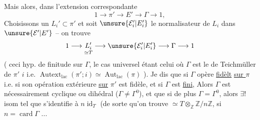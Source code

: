 Mais alors, dans l'extension correspondante
\[
1\longrightarrow\pi'\longrightarrow E'\longrightarrow\Gamma\longrightarrow1,
\]
Choisissons un \(L_i'\subset\pi'\) et soit \(\unsure{\mathcal E_i'|E_i'}\) le normalisateur de \(L_i\) dans \(\unsure{\mathcal E'|E'}\) -- on trouve
\[
1\longrightarrow
\underset{\simeq T}{L_i'}
\longrightarrow\unsure{\mathcal E_i'|E_i'}
\longrightarrow\Gamma\longrightarrow1
\]
( ceci   hyp. de finitude sur
$\Gamma$, le cas universel étant celui où $\Gamma$
est le  de Teichmüller de $\pi'$  $i$
i.e. $\operatorname{Autext}_{\mathrm{lac}}(\pi';i)\simeq\operatorname{Aut}_{\mathrm{lac}}(\pi)$ ). Je
dis que si $\Gamma$ opère \uline{fidèlt} \uline{sur $\pi$}
i.e. si son opération extérieure \uline{sur}
\uline{$\pi'$} est fidèle, et si $\Gamma$ est \uline{fini},
Alors $\Gamma$ est nécessairement cyclique 
ou dihédral ($\Gamma\ne\Gamma^0$), et que si de
plus $\Gamma=\Gamma^0$, alors   $\exists!$ isom
 tel que  s'identifie à
$n\operatorname{id}_T$ (de sorte qu'on trouve 
$\simeq T\otimes_{\mathbb Z}\mathbb Z/n\mathbb Z$, si $n=\operatorname{card}\Gamma$ ...

